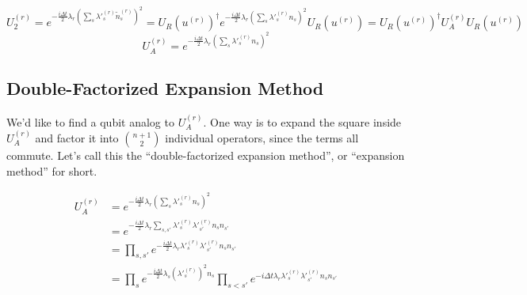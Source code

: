 \begin{equation}
    U_2^{(r)} = e^{-\frac{i\Delta t}{2}\lambda_r\left(\sum_s \lambda'^{(r)}_s \tilde{n}^{(r)}_s\right)^2} = U_R(u^{(r)})^\dag e^{-\frac{i\Delta t}{2}\lambda_r\left(\sum_s \lambda'^{(r)}_s n_s\right)^2}U_R(u^{(r)}) = U_R(u^{(r)})^\dag U_A^{(r)}U_R(u^{(r)})
    \label{eq: U_2^r}
\end{equation}
\begin{equation}
    U_A^{(r)} = e^{-\frac{i\Delta t}{2}\lambda_r\left(\sum_s \lambda'^{(r)}_s n_s\right)^2}
\end{equation}

\subsection{Double-Factorized Expansion Method}

We'd like to find a qubit analog to $U_A^{(r)}$. One way is to expand the square inside $U_A^{(r)}$ and factor it into ${n + 1 \choose 2}$ individual operators, since the terms all commute. Let's call this the ``double-factorized expansion method'', or ``expansion method'' for short.

\begin{equation}
    \begin{split}
        U_A^{(r)} &= e^{-\frac{i\Delta t}{2}\lambda_r\left(\sum_s \lambda'^{(r)}_s n_s\right)^2} \\
        &= e^{-\frac{i\Delta t}{2}\lambda_r\sum_{s, s'} \lambda'^{(r)}_s\lambda'^{(r)}_{s'} n_sn_{s'}} \\
        &= \prod_{s, s'} e^{-\frac{i\Delta t}{2}\lambda_r\lambda'^{(r)}_s\lambda'^{(r)}_{s'} n_sn_{s'}} \\
        &= \prod_s e^{-\frac{i\Delta t}{2}\lambda_s(\lambda'^{(r)}_s)^2 n_s}\prod_{s < s'} e^{-i\Delta t\lambda_r\lambda'^{(r)}_s\lambda'^{(r)}_{s'} n_sn_{s'}}
        \label{eq: expansion}
    \end{split}
\end{equation}

